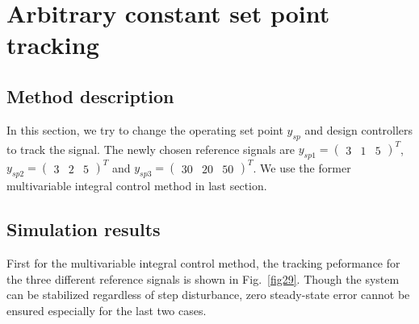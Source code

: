 \documentclass[hyperref]{article}
\theoremstyle{nonumberplain}
\begin{document}
	
	\section{Arbitrary constant set point tracking}
	
	\subsection{Method description}
	
	\hspace{1.0em}
	In this section, we try to change the operating set point $y_{sp}$ and design controllers to track the signal. The newly chosen reference signals are $y_{sp1}=\begin{pmatrix}
	3 &1  &5 
	\end{pmatrix}^{T}$, $y_{sp2}=\begin{pmatrix}
	3 &2  &5 
	\end{pmatrix}^{T}$ and $y_{sp3}=\begin{pmatrix}
	30 &20  &50 
	\end{pmatrix}^{T}$. We use the former multivariable integral control method in last section.
	
	\subsection{Simulation results}
	
	\hspace{1.0em}
	First for the multivariable integral control method, the tracking peformance for the three different reference signals is shown in Fig.~\ref{fig29}. Though the system can be stabilized regardless of step disturbance, zero steady-state error cannot be ensured especially for the last two cases.
	
\end{document}

